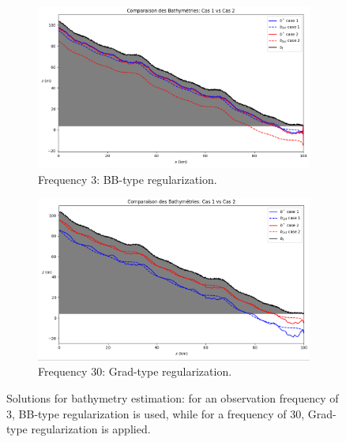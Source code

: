 \documentclass{article}
\begin{document}
\begin{figure}[H]
    \centering
    \begin{subfigure}[b]{0.48\textwidth}
        \centering
        \includegraphics[width=\linewidth]{Images_Ayoub/Test_Cases_Tasks/Unmonitored/3/Pasted image.png}
        \caption{Frequency 3: BB-type regularization.}
        \label{fig:freq3_bb}
    \end{subfigure}
    \hfill
    \begin{subfigure}[b]{0.48\textwidth}
        \centering
        \includegraphics[width=\linewidth]{Images_Ayoub/Test_Cases_Tasks/Unmonitored/30/Pasted image.png}
        \caption{Frequency 30: Grad-type regularization.}
        \label{fig:freq30_grad}
    \end{subfigure}
    \caption{Solutions for bathymetry estimation: for an observation frequency of 3, BB-type regularization is used, while for a frequency of 30, Grad-type regularization is applied.}
    \label{fig:comp_regul}
\end{figure}
\end{document}
